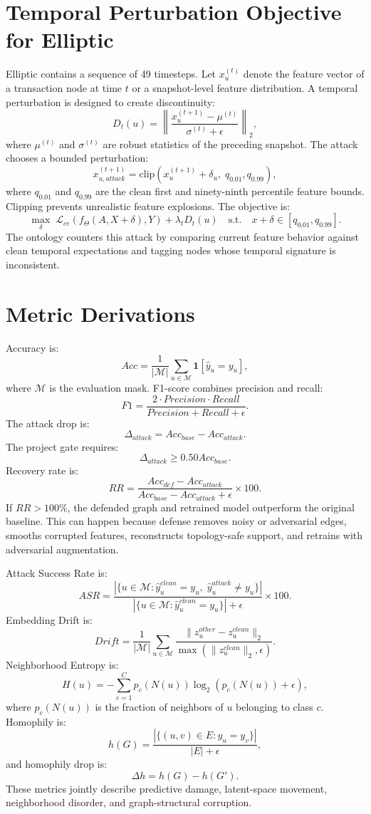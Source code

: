 \documentclass[12pt,oneside]{report}
\begin{document}
\section{Temporal Perturbation Objective for Elliptic}
Elliptic contains a sequence of 49 timesteps. Let $x_u^{(t)}$ denote the feature vector of a transaction node at time $t$ or a snapshot-level feature distribution. A temporal perturbation is designed to create discontinuity:
$$
D_t(u)=\left\|\frac{x_u^{(t+1)}-\mu^{(t)}}{\sigma^{(t)}+\epsilon}\right\|_2,
$$
where $\mu^{(t)}$ and $\sigma^{(t)}$ are robust statistics of the preceding snapshot. The attack chooses a bounded perturbation:
$$
x_{u,attack}^{(t+1)}=\text{clip}\left(x_u^{(t+1)}+\delta_u,\;q_{0.01},q_{0.99}\right),
$$
where $q_{0.01}$ and $q_{0.99}$ are the clean first and ninety-ninth percentile feature bounds. Clipping prevents unrealistic feature explosions. The objective is:
$$
\max_{\delta}\;\mathcal{L}_{ce}\left(f_{\Theta}(A,X+\delta),Y\right)
+\lambda_t D_t(u)
\quad\text{s.t.}\quad x+\delta\in[q_{0.01},q_{0.99}].
$$
The ontology counters this attack by comparing current feature behavior against clean temporal expectations and tagging nodes whose temporal signature is inconsistent.

\section{Metric Derivations}
Accuracy is:
$$
Acc=\frac{1}{|\mathcal{M}|}\sum_{u\in\mathcal{M}}\mathbf{1}[\hat{y}_u=y_u],
$$
where $\mathcal{M}$ is the evaluation mask. F1-score combines precision and recall:
$$
F1=\frac{2\cdot Precision\cdot Recall}{Precision+Recall+\epsilon}.
$$
The attack drop is:
$$
\Delta_{attack}=Acc_{base}-Acc_{attack}.
$$
The project gate requires:
$$
\Delta_{attack}\geq 0.50Acc_{base}.
$$
Recovery rate is:
$$
RR=\frac{Acc_{def}-Acc_{attack}}{Acc_{base}-Acc_{attack}+\epsilon}\times 100.
$$
If $RR>100\%$, the defended graph and retrained model outperform the original baseline. This can happen because defense removes noisy or adversarial edges, smooths corrupted features, reconstructs topology-safe support, and retrains with adversarial augmentation.

Attack Success Rate is:
$$
ASR=
\frac{|\{u\in\mathcal{M}: \hat{y}^{clean}_u=y_u,\;\hat{y}^{attack}_u\neq y_u\}|}
{|\{u\in\mathcal{M}: \hat{y}^{clean}_u=y_u\}|+\epsilon}\times 100.
$$
Embedding Drift is:
$$
Drift=
\frac{1}{|\mathcal{M}|}\sum_{u\in\mathcal{M}}
\frac{\|z^{other}_u-z^{clean}_u\|_2}
{\max(\|z^{clean}_u\|_2,\epsilon)}.
$$
Neighborhood Entropy is:
$$
H(u)=-\sum_{c=1}^{C}p_c(N(u))\log_2(p_c(N(u))+\epsilon),
$$
where $p_c(N(u))$ is the fraction of neighbors of $u$ belonging to class $c$. Homophily is:
$$
h(G)=\frac{|\{(u,v)\in E:y_u=y_v\}|}{|E|+\epsilon},
$$
and homophily drop is:
$$
\Delta h=h(G)-h(G').
$$
These metrics jointly describe predictive damage, latent-space movement, neighborhood disorder, and graph-structural corruption.
\end{document}

